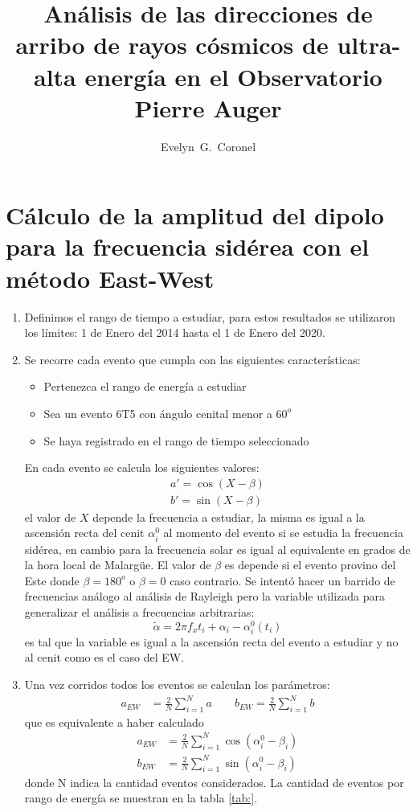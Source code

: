 \documentclass[11pt,papel,oneside,singlespace]{ibtesis}
\title{Análisis de las direcciones de arribo de rayos cósmicos de ultra-alta energía en el Observatorio Pierre Auger}
\author{Evelyn~G.~Coronel}
\begin{document}
\section{Cálculo de la amplitud del dipolo para la frecuencia sidérea con el método East-West}

\begin{enumerate}
    \item Definimos el rango de tiempo a estudiar, para estos resultados se utilizaron los límites: 1 de Enero del 2014 hasta el 1 de Enero del 2020.
    \item Se recorre cada evento que cumpla con las siguientes características:
     \begin{itemize}
        \item Pertenezca el rango de energía a estudiar
        \item Sea un evento 6T5 con ángulo cenital menor a $60^o$
        \item Se haya registrado en el rango de tiempo seleccionado
    \end{itemize}
    En cada evento se calcula los siguientes valores:
    \begin{align}
        a' = \cos(X - \beta)\\
        b' = \sin(X - \beta)
    \end{align}
    el valor de $X$ depende la frecuencia a estudiar, la misma es igual a la ascensión recta del cenit $\alpha^0_i$ al momento del evento  si se estudia la frecuencia sidérea, en cambio para la frecuencia solar es igual al equivalente en grados de la hora local de Malargüe. El valor de $\beta$ es depende si el evento provino del Este donde $\beta=180^o$ o $\beta=0$ caso contrario.
    Se intentó hacer un barrido de frecuencias análogo al análisis de Rayleigh pero la variable utilizada para generalizar el análisis a frecuencias arbitrarias:
    \begin{equation}
        \tilde{\alpha} = 2\pi f_x t_i + \alpha_i - \alpha_i^0(t_i) \label{ra_mod}
      \end{equation}
    es tal que la variable es igual a la ascensión recta del evento a estudiar y no al cenit como es el caso del EW. 
    \item Una vez corridos todos los  eventos se calculan los parámetros:
    \begin{align*}
        a_{EW} &= \frac{2}{N} \sum^N_{i=1} a \qquad
        b_{EW} = \frac{2}{N} \sum^N_{i=1} b
    \end{align*}
    que es equivalente a haber calculado
    \begin{align*}
        a_{EW} &= \frac{2}{N} \sum^N_{i=1} \cos(\alpha^0_i - \beta_i)\\
        b_{EW} &= \frac{2}{N} \sum^N_{i=1} \sin(\alpha^0_i - \beta_i)
    \end{align*}
    donde N indica la cantidad eventos considerados. La cantidad de eventos por rango de energía se muestran en la tabla \ref{tab:}.


\end{enumerate}
\end{document}
